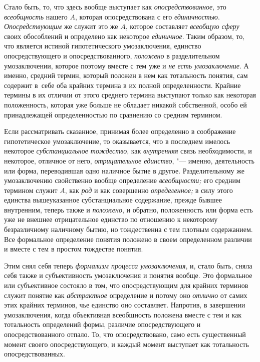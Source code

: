 Стало быть, то, что здесь вообще выступает как {\em опосредствованное},
это {\em всеобщность} нашего $A$, которая опосредствована с его
{\em единичностью}. {\em Опосредствующим} же служит это же $A$,
которое составляет {\em всеобщую сферу}
своих обособлений и определено как некоторое {\em единичное}. Таким
образом, то, что является истиной гипотетического умозаключения, единство
опосредствующего и опосредствованного, {\em положено} в
разделительном умозаключении, которое поэтому вместе с тем уже и
{\em не есть умозаключение}.
А именно, средний термин, который положен в нем как
тотальность понятия, сам содержит в~себе оба крайних термина в их полной
определенности. Крайние термины в их отличии от этого среднего термина
выступают только как некоторая положенность, которая уже больше не обладает
никакой собственной, особо ей принадлежащей определенностью по сравнению со
средним термином.

Если рассматривать сказанное, принимая более определенно в
соображение гипотетическое умозаключение, то оказывается, что в последнем
имелось некоторое {\em субстанциальное тождество}, как {\em внутренняя} связь
необходимости, и некоторое, отличное от него,
{\em отрицательное единство}, "---
именно, деятельность или форма, переводившая одно наличное
бытие в другое. Разделительному же умозаключению свойственно вообще
определение {\em всеобщности;} его средним термином служит $A$,
как {\em род} и как совершенно {\em определенное;} в
силу этого единства вышеуказанное субстанциальное содержание, прежде бывшее
внутренним, теперь также и {\em положено}, и
обратно, положенность или форма есть уже не внешнее отрицательное единство
по отношению к некоторому безразличному наличному бытию, но тождественна с
тем плотным содержанием. Все формальное определение понятия положено в
своем определенном различии и вместе с тем в простом тождестве понятия.

Этим снял себя теперь {\em формализм процесса умозаключения},
и, стало быть, сняла себя также и субъективность
умозаключения и понятия вообще. Это формальное или субъективное состояло в
том, что опосредствующим для крайних терминов служит понятие как
{\em абстрактное} определение и потому оно {\em отлично} от самих
этих крайних терминов, чье единство оно составляет. Напротив, в завершении
умозаключения, когда объективная всеобщность положена вместе с тем и как
тотальность определений формы, различие опосредствующего и
опосредствованного отпало. То, что опосредствовано, само есть существенный
момент своего опосредствующего, и каждый момент выступает как тотальность
опосредствованных.

